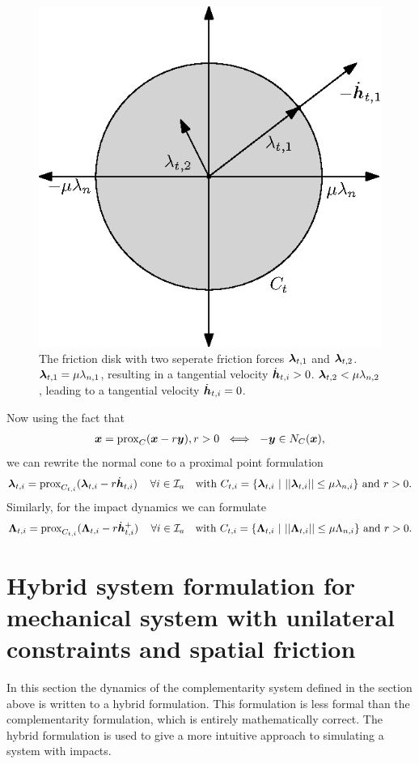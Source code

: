 \documentclass[DC2017114Bouma.tex]{subfiles}
\begin{document}
\begin{figure}[h]
\centering
\includegraphics[width=.5\textwidth]{frictiondisk.eps}\caption{The friction disk with two seperate friction forces $\boldsymbol{\lambda}_{t,1}$ and $\boldsymbol{\lambda}_{t,2}$. $\boldsymbol{\lambda}_{t,1} = \mu\lambda_{n,1}$, resulting in a tangential velocity $\dot{{\boldsymbol{h}}}_{t,i}>0$. $\boldsymbol{\lambda}_{t,2}<\mu\lambda_{n,2}$, leading to a tangential velocity $\dot{{\boldsymbol{h}}}_{t,i}=0$.}\label{fig:frictiondisk}
\end{figure}

Now using the fact that
\begin{align}
{\boldsymbol{x}} = \operatorname{\text{prox}}_C({\boldsymbol{x}} -r{\boldsymbol{y}}), r > 0\ \iff\ -{\boldsymbol{y}}\in N_C({\boldsymbol{x}}),
\end{align}
we can rewrite the normal cone to a proximal point formulation
\begin{align}
\boldsymbol{\lambda}_{t,i} = \operatorname{\text{prox}}_{C_{t,i}}(\boldsymbol{\lambda}_{t,i} - r\dot{{\boldsymbol{h}}}_{t,i})\,\quad \forall i\in\mathcal{I}_a\quad\text{with }C_{t,i} = \{\boldsymbol{\lambda}_{t,i}\ |\ ||\boldsymbol{\lambda}_{t,i}|| \leq \mu\lambda_{n,i}\}\text{ and }r>0.
\end{align}
Similarly, for the impact dynamics we can formulate
\begin{align}
\boldsymbol{\Lambda}_{t,i} = \operatorname{\text{prox}}_{C_{t,i}}(\boldsymbol{\Lambda}_{t,i} - r\dot{{\boldsymbol{h}}}^+_{t,i})\,\quad \forall i\in\mathcal{I}_a\quad\text{with }C_{t,i} = \{\boldsymbol{\Lambda}_{t,i}\ |\ ||\boldsymbol{\Lambda}_{t,i}|| \leq \mu\Lambda_{n,i}\}\text{ and }r>0.
\end{align}

\section{Hybrid system formulation for mechanical system with unilateral constraints and spatial friction}
In this section the dynamics of the complementarity system defined in the section above is written to a hybrid formulation. This formulation is less formal than the complementarity formulation, which is entirely mathematically correct. The hybrid formulation is used to give a more intuitive approach to simulating a system with impacts. 
\end{document}
